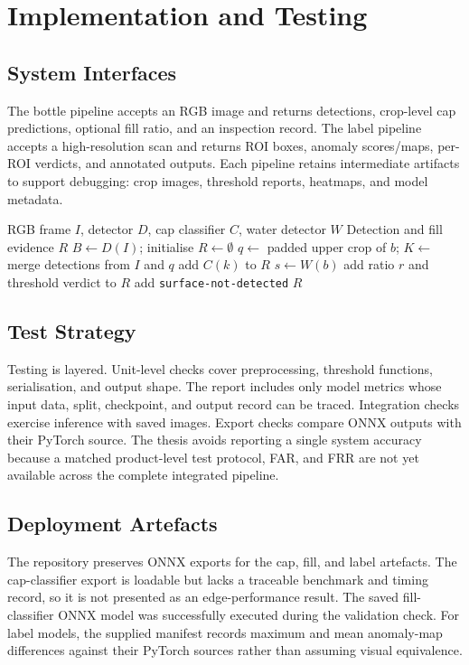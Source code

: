 \documentclass[12pt,a4paper]{report}
\begin{document}
\chapter{Implementation and Testing}
\section{System Interfaces}
The bottle pipeline accepts an RGB image and returns detections, crop-level cap predictions, optional fill ratio, and an inspection record. The label pipeline accepts a high-resolution scan and returns ROI boxes, anomaly scores/maps, per-ROI verdicts, and annotated outputs. Each pipeline retains intermediate artifacts to support debugging: crop images, threshold reports, heatmaps, and model metadata.

\begin{algorithm}[ht]\caption{Bottle inspection prototype}\begin{algorithmic}[1]
\Require RGB frame $I$, detector $D$, cap classifier $C$, water detector $W$
\Ensure Detection and fill evidence $R$
\State $B\gets D(I)$; initialise $R\gets\emptyset$
 \State $q\gets$ padded upper crop of $b$; $K\gets$ merge detections from $I$ and $q$
  \State add $C(k)$ to $R$ \EndFor
 \State $s\gets W(b)$
  \State add ratio $r$ and threshold verdict to $R$ \Else \State add \texttt{surface-not-detected} \EndIf
\EndFor\State \Return $R$
\end{algorithmic}\end{algorithm}

\section{Test Strategy}
Testing is layered. Unit-level checks cover preprocessing, threshold functions, serialisation, and output shape. The report includes only model metrics whose input data, split, checkpoint, and output record can be traced. Integration checks exercise inference with saved images. Export checks compare ONNX outputs with their PyTorch source. The thesis avoids reporting a single system accuracy because a matched product-level test protocol, FAR, and FRR are not yet available across the complete integrated pipeline.

\section{Deployment Artefacts}
The repository preserves ONNX exports for the cap, fill, and label artefacts. The cap-classifier export is loadable but lacks a traceable benchmark and timing record, so it is not presented as an edge-performance result. The saved fill-classifier ONNX model was successfully executed during the validation check. For label models, the supplied manifest records maximum and mean anomaly-map differences against their PyTorch sources rather than assuming visual equivalence.
\end{document}
